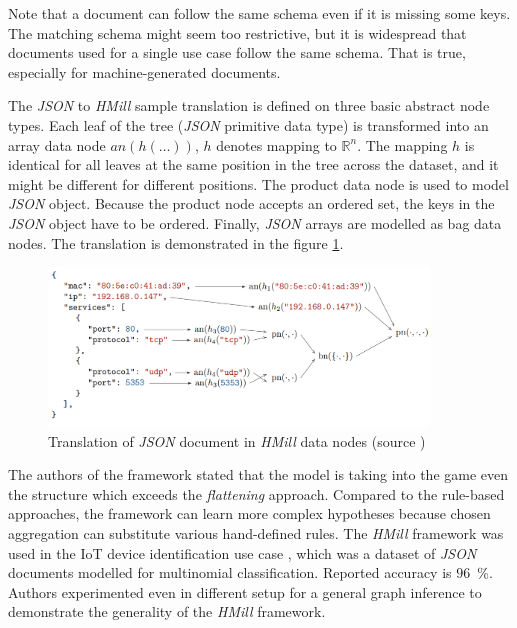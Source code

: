Note that a document can follow the same schema even if it is missing some keys. The matching schema might seem too restrictive, but it is widespread that documents used for a single use case follow the same schema. That is true, especially for machine-generated documents.

The \emph{JSON} to \emph{HMill} sample translation is defined on three basic abstract node types. Each leaf of the tree (\emph{JSON} primitive data type) is transformed into an array data node $an(h(\dots))$, $h$ denotes mapping to $\mathbb{R}^n$. The mapping $h$ is identical for all leaves at the same position in the tree across the dataset, and it might be different for different positions. The product data node is used to model \emph{JSON} object. Because the product node accepts an ordered set, the keys in the \emph{JSON} object have to be ordered. Finally, \emph{JSON} arrays are modelled as bag data nodes. The translation is demonstrated in the figure \ref{fig:jsonhmill}.


\begin{figure}[h]
    \centering
    \includegraphics[width=0.9\textwidth]{figures/translation.png}
    \caption{Translation of \emph{JSON} document in \emph{HMill} data nodes (source \cite{Mandlik2020})}
    \label{fig:jsonhmill}
\end{figure}

The authors of the framework stated that the model is taking into the game even the structure which exceeds the \emph{flattening} approach. Compared to the rule-based approaches, the framework can learn more complex hypotheses because chosen aggregation can substitute various hand-defined rules. The \emph{HMill} framework was used in the IoT device identification use case \cite{Mandlik2020}, which was a dataset of \emph{JSON} documents modelled for multinomial classification. Reported accuracy is $96$~\%. Authors experimented even in different setup for a general graph inference to demonstrate the generality of the \emph{HMill} framework.


